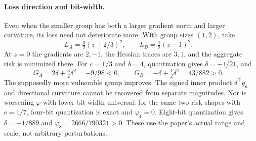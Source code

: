 \documentclass[10pt]{article}
\begin{document}
\paragraph*{Loss direction and bit-width.}\mbox{}\par
Even when the smaller group has both a larger gradient norm and larger curvature, its loss need not deteriorate more. With group sizes \((1,2)\), take \[L_A=\tfrac32(z+2/3)^2,\qquad L_B=\tfrac12(z-1)^2.\] At \(z=0\) the gradients are \(2,-1\), the Hessian traces are \(3,1\), and the aggregate risk is minimized there. For \(c=1/3\) and \(b=4\), quantization gives \(\delta=-1/21\), and \[G_A=2\delta+\tfrac32\delta^2=-9/98<0,
 \qquad G_B=-\delta+\tfrac12\delta^2=43/882>0.\] The supposedly more vulnerable group improves. The signed inner product \(\delta^{\top}g_a\) and directional curvature cannot be recovered from separate magnitudes. Nor is worsening \(\varphi\) with lower bit-width universal: for the same two risk shapes with \(c=1/7\), four-bit quantization is exact and \(\varphi_4=0\). Eight-bit quantization gives \(\delta=-1/889\) and \(\varphi_8=2666/790321>0\). These use the paper’s actual range and scale, not arbitrary perturbations.\par
\end{document}
